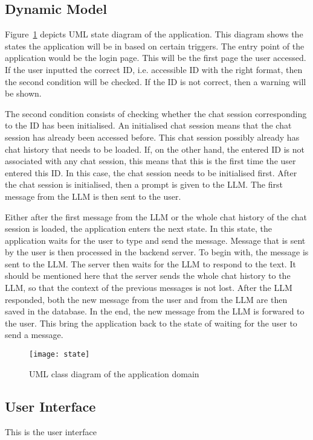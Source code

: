 \subsection{Dynamic Model}


Figure~\ref{state} depicts UML state diagram of the application.
This diagram shows the states the application will be in based on certain triggers.
The entry point of the application would be the login page.
This will be the first page the user accessed.
If the user inputted the correct ID, i.e. accessible ID with the right format, then the second condition will be checked.
If the ID is not correct, then a warning will be shown.

The second condition consists of checking whether the chat session corresponding to the ID has been initialised.
An initialised chat session means that the chat session has already been accessed before.
This chat session possibly already has chat history that needs to be loaded.
If, on the other hand, the entered ID is not associated with any chat session, this means that this is the first time the user entered this ID.
In this case, the chat session needs to be initialised first.
After the chat session is initialised, then a prompt is given to the \ac{LLM}.
The first message from the \ac{LLM} is then sent to the user.

Either after the first message from the \ac{LLM} or the whole chat history of the chat session is loaded, the application enters the next state.
In this state, the application waits for the user to type and send the message.
Message that is sent by the user is then processed in the backend server.
To begin with, the message is sent to the \ac{LLM}.
The server then waits for the \ac{LLM} to respond to the text.
It should be mentioned here that the server sends the whole chat history to the \ac{LLM}, so that the context of the previous messages is not lost.
After the \ac{LLM} responded, both the new message from the user and from the \ac{LLM} are then saved in the database.
In the end, the new message from the \ac{LLM} is forwared to the user.
This bring the application back to the state of waiting for the user to send a message.

\begin{figure}[h!]
    \centering
    \texttt{[image: state]}
    \caption{UML class diagram of the application domain}\label{state}
\end{figure}


\subsection{User Interface}


This is the user interface